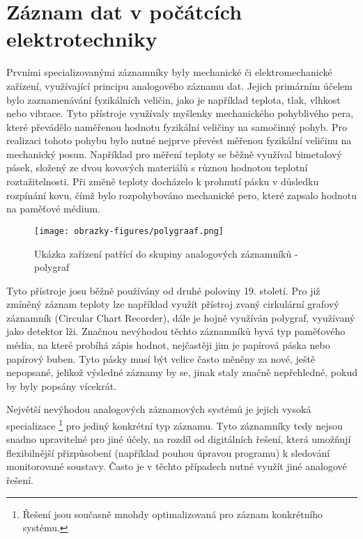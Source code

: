 \section{Záznam dat v počátcích elektrotechniky}
\label{zaznam}
Prvními specializovanými záznamníky byly mechanické či elektromechanické zařízení, využívající principu analogového záznamu dat. 
Jejich primárním účelem bylo zaznamenávání fyzikálních veličin, jako je například teplota, tlak, vlhkost nebo vibrace. 
Tyto přístroje využívaly myšlenky mechanického pohyblivého pera, které převádělo naměřenou hodnotu fyzikální veličiny na 
samočinný pohyb. Pro realizaci tohoto pohybu bylo nutné nejprve převést měřenou fyzikální veličinu na mechanický posun. 
Například pro měření teploty se běžně využíval bimetalový pásek, složený ze dvou kovových materiálů s různou hodnotou teplotní 
roztažitelnosti. Při změně teploty docházelo k prohnutí pásku v důsledku rozpínání kovu, čímž bylo rozpohybováno mechanické pero, 
které zapsalo hodnotu na paměťové médium. 


\begin{figure}[h] %
    \centering
    \texttt{[image: obrazky-figures/polygraaf.png]}
    \caption{Ukázka zařízení patřící do skupiny analogových záznamníků - polygraf \cite{polygraph_picture}}
    \label{fig:polygraaf}
\end{figure}


Tyto přístroje josu běžně používány od druhé poloviny 19. století. Pro již zmíněný záznam teploty lze například využít přístroj 
zvaný cirkulární grafový záznamník (Circular Chart Recorder), dále je hojně využíván polygraf, využívaný jako detektor lži. 
Značnou nevýhodou těchto záznamníků byvá typ paměťového média, na které probíhá zápis hodnot, nejčastěji jim je papírová páska 
nebo papírový buben. Tyto pásky musí být velice často měněny za nové, ještě nepopsané, jelikož výsledné záznamy by se, jinak staly 
značně nepřehledné, pokud by byly popsány vícekrát. \cite{origin_of_chart_recorders}

Největší nevýhodou analogových záznamových systémů je jejich vysoká specializace \footnote{Řešení jsou současně mnohdy 
optimalizovaná pro záznam konkrétního systému.} pro jediný konkrétní typ záznamu. Tyto záznamníky tedy nejsou snadno upravitelné 
pro jiné účely, na rozdíl od digitálních řešení, která umožňují flexibilnější přizpůsobení (například pouhou úpravou programu) k 
sledování monitorované soustavy. Často je v těchto případech nutné využít jiné analogové 
řešení. \cite{analog_signal_and_digital_signal_processing_Tel_System}

